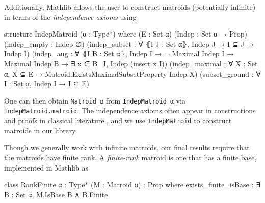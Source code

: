 Additionally, Mathlib allows the user to construct matroids (potentially infinite) in terms of the \emph{independence axioms} using
\begin{leancode}
structure IndepMatroid (α : Type*) where
  (E : Set α)
  (Indep : Set α → Prop)
  (indep_empty : Indep ∅)
  (indep_subset : ∀ ⦃I J : Set α⦄,
    Indep J → I ⊆ J → Indep I)
  (indep_aug : ∀ ⦃I B : Set α⦄, Indep I → 
    ¬ Maximal Indep I → Maximal Indep B →
    ∃ x ∈ B \ I, Indep (insert x I))
  (indep_maximal : ∀ X : Set α, X ⊆ E → 
    Matroid.ExistsMaximalSubsetProperty Indep X)
  (subset_ground : ∀ I : Set α, Indep I → I ⊆ E)
\end{leancode}
One can then obtain \texttt{Matroid α} from \texttt{IndepMatroid α} via \texttt{IndepMatroid.matroid}. The independence axioms often appear in constructions and proofs in classical literature \hbox{\cite{Oxley2011,Truemper2016}}, and we use \texttt{IndepMatroid} to construct matroids in our library. %

Though we generally work with infinite matroids, our final results require that the matroids have finite rank. A \emph{finite-rank} matroid is one that has a finite base, implemented in Mathlib as
\begin{leancode}
class RankFinite {α : Type*} (M : Matroid α) :
    Prop where
  exists_finite_isBase :
    ∃ B : Set α, M.IsBase B ∧ B.Finite
\end{leancode}
